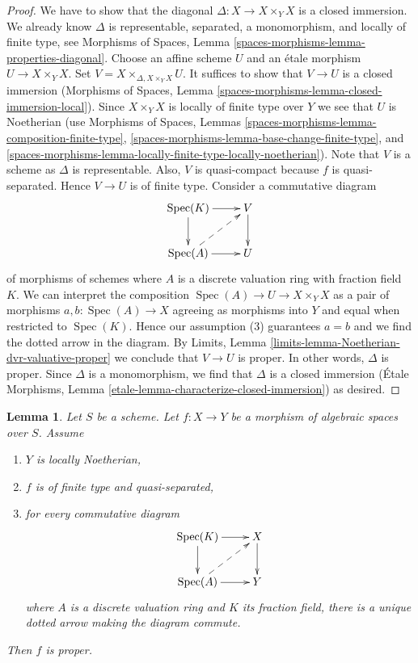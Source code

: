 \documentclass{stacks-project}
\theoremstyle{plain}
\newtheorem{lemma}[subsection]{Lemma}
\theoremstyle{definition}
\theoremstyle{remark}
\numberwithin{equation}{subsection}
\def\Spec{\mathop{\mathrm{Spec}}}
\begin{document}
\begin{proof}
We have to show that the diagonal $\Delta : X \to X \times_Y X$ is a closed
immersion. We already know $\Delta$ is representable, separated,
a monomorphism, and locally of finite type, see Morphisms of Spaces, Lemma
\ref{spaces-morphisms-lemma-properties-diagonal}.
Choose an affine scheme $U$ and an \'etale morphism
$U \to X \times_Y X$. Set $V = X \times_{\Delta, X \times_Y X} U$.
It suffices to show that $V \to U$ is a closed immersion
(Morphisms of Spaces, Lemma
\ref{spaces-morphisms-lemma-closed-immersion-local}).
Since $X \times_Y X$ is locally of finite type over $Y$ we see that
$U$ is Noetherian (use Morphisms of Spaces, Lemmas
\ref{spaces-morphisms-lemma-composition-finite-type},
\ref{spaces-morphisms-lemma-base-change-finite-type}, and
\ref{spaces-morphisms-lemma-locally-finite-type-locally-noetherian}).
Note that $V$ is a scheme as $\Delta$ is representable.
Also, $V$ is quasi-compact because $f$ is quasi-separated.
Hence $V \to U$ is of finite type. Consider a commutative diagram
$$
\xymatrix{
\Spec(K) \ar[r] \ar[d] & V \ar[d] \\
\Spec(A) \ar[r] \ar@{-->}[ru] & U
}
$$
of morphisms of schemes
where $A$ is a discrete valuation ring with fraction field $K$.
We can interpret the composition $\Spec(A) \to U \to X \times_Y X$
as a pair of morphisms $a, b : \Spec(A) \to X$ agreeing as morphisms
into $Y$ and equal when restricted to $\Spec(K)$. Hence our assumption
(3) guarantees $a = b$ and we find the dotted arrow in the diagram.
By Limits, Lemma \ref{limits-lemma-Noetherian-dvr-valuative-proper}
we conclude that $V \to U$ is proper. In other words, $\Delta$ is proper.
Since $\Delta$ is a monomorphism, we find that $\Delta$ is a
closed immersion (\'Etale Morphisms, Lemma
\ref{etale-lemma-characterize-closed-immersion}) as desired.
\end{proof}

\begin{lemma}
\label{lemma-check-proper-dvr}
Let $S$ be a scheme. Let $f : X \to Y$ be a morphism of algebraic
spaces over $S$. Assume
\begin{enumerate}
\item $Y$ is locally Noetherian,
\item $f$ is of finite type and quasi-separated,
\item for every commutative diagram
$$
\xymatrix{
\Spec(K) \ar[r] \ar[d] & X \ar[d] \\
\Spec(A) \ar[r] \ar@{-->}[ru] & Y
}
$$
where $A$ is a discrete valuation ring and $K$ its fraction field,
there is a unique dotted arrow making the diagram commute.
\end{enumerate}
Then $f$ is proper.
\end{lemma}
\end{document}
